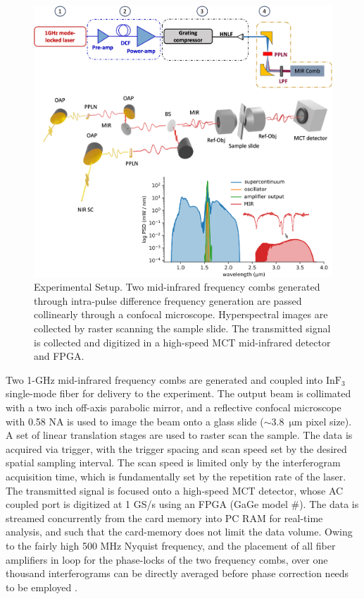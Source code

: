 \documentclass{optica-article}
\begin{document}
\begin{figure}[h]
    \centering
    \includegraphics[width=\linewidth]{setup_3D_v3.png}
    \caption{Experimental Setup. Two mid-infrared frequency combs generated through intra-pulse difference frequency generation are passed collinearly through a confocal microscope. Hyperspectral images are collected by raster scanning the sample slide. The transmitted signal is collected and digitized in a high-speed MCT mid-infrared detector and FPGA.}
    \label{fig:setup}
\end{figure}

Two 1-GHz mid-infrared frequency combs are generated and coupled into $\mathrm{InF_3}$ single-mode fiber for delivery to the experiment. The output beam is collimated with a two inch off-axis parabolic mirror, and a reflective confocal microscope with 0.58 NA is used to image the beam onto a glass slide (\mbox{$\sim$3.8 $\mathrm{\mu m}$} pixel size). A set of linear translation stages are used to raster scan the sample. The data is acquired via trigger, with the trigger spacing and scan speed set by the desired spatial sampling interval. The scan speed is limited only by the interferogram acquisition time, which is fundamentally set by the repetition rate of the laser. The transmitted signal is focused onto a high-speed MCT detector, whose AC coupled port is digitized at 1 GS/s using an FPGA (GaGe model \#). The data is streamed concurrently from the card memory into PC RAM for real-time analysis, and such that the card-memory does not limit the data volume. Owing to the fairly high 500 MHz Nyquist frequency, and the placement of all fiber amplifiers in loop for the phase-locks of the two frequency combs, over one thousand interferograms can be directly averaged before phase correction needs to be employed \cite{hebertSelfcorrectedChipbasedDualcomb2017,hebertSelfCorrectionLimitsDualComb2019}.
\end{document}
